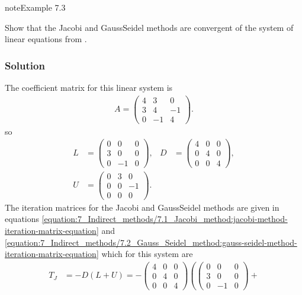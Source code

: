 \documentclass[letterpaper,10pt,english]{jupyterBook}
\begin{document}
\begin{sphinxadmonition}{note}{Example 7.3}

\sphinxAtStartPar
Show that the Jacobi and Gauss\sphinxhyphen{}Seidel methods are convergent of the system of linear equations from {\hyperref[\detokenize{7_Indirect_methods/7.1_Jacobi_method:jacobi-method-example}]{}}.
\subsubsection*{Solution}

\sphinxAtStartPar
The coefficient matrix for this linear system is
\begin{align*}
    A = \begin{pmatrix} 4 & 3 & 0 \\ 3 & 4 & -1 \\ 0 & -1 & 4 \end{pmatrix}.
\end{align*}
\sphinxAtStartPar
so
\begin{align*}
    L &= \begin{pmatrix} 0 & 0 & 0 \\ 3 & 0 & 0 \\ 0 & -1 & 0 \end{pmatrix}, &
    D &= \begin{pmatrix} 4 & 0 & 0 \\ 0 & 4 & 0 \\ 0 & 0 & 4 \end{pmatrix}, \\
    U &= \begin{pmatrix} 0 & 3 & 0 \\ 0 & 0 & -1 \\ 0 & 0 & 0 \end{pmatrix}.
\end{align*}
\sphinxAtStartPar
The iteration matrices for the Jacobi and Gauss\sphinxhyphen{}Seidel methods are given in equations \eqref{equation:7_Indirect_methods/7.1_Jacobi_method:jacobi-method-iteration-matrix-equation} and \eqref{equation:7_Indirect_methods/7.2_Gauss_Seidel_method:gauss-seidel-method-iteration-matrix-equation} which for this system are
\begin{align*}
    T_J &= -D ( L + U) 
    = -\begin{pmatrix} 4 & 0 & 0 \\ 0 & 4 & 0 \\ 0 & 0 & 4 \end{pmatrix} \left(
    \begin{pmatrix} 0 & 0 & 0 \\ 3 & 0 & 0 \\ 0 & -1 & 0 \end{pmatrix} +

\end{align*}
\end{sphinxadmonition}
\end{document}
